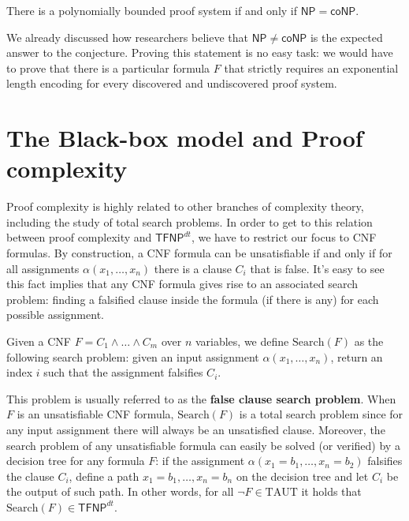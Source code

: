 \begin{proposition}
 There is a polynomially bounded proof system if and only if $\mathsf{NP} = \mathsf{coNP}$.
\end{proposition}

We already discussed how researchers believe that $\mathsf{NP} \neq \mathsf{coNP}$ is the expected answer to the conjecture. Proving this statement is no easy task: we would have to prove that there is a particular formula $F$ that strictly requires an exponential length encoding for every discovered and undiscovered proof system.

\newpage

\section{The Black-box model and Proof complexity}

Proof complexity is highly related to other branches of complexity theory, including the study of total search problems. In order to get to this relation between proof complexity and $\mathsf{TFNP}^{dt}$, we have to restrict our focus to CNF formulas. By construction, a CNF formula can be unsatisfiable if and only if for all assignments $\alpha(x_1, \ldots, x_n)$ there is a clause $C_i$ that is false. It's easy to see this fact implies that any CNF formula gives rise to an associated search problem: finding a falsified clause inside the formula (if there is any) for each possible assignment.

\begin{definition}
 Given a CNF $F = C_1 \land \ldots \land C_m$ over $n$ variables, we define $\mathrm{Search}(F)$ as the following search problem: given an input assignment $\alpha(x_1, \ldots, x_n)$, return an index $i$ such that the assignment falsifies $C_i$.
\end{definition}

This problem is usually referred to as the \textbf{false clause search problem}. When $F$ is an unsatisfiable CNF formula, $\mathrm{Search}(F)$ is a total search problem since for any input assignment there will always be an unsatisfied clause. Moreover, the search problem of any unsatisfiable formula can easily be solved (or verified) by a decision tree for any formula $F$: if the assignment $\alpha(x_1 = b_1, \ldots, x_n = b_2)$ falsifies the clause $C_i$, define a path $x_1 = b_1, \ldots, x_n = b_n$ on the decision tree and let $C_i$ be the output of such path. In other words, for all $\lnot F \in \mathrm{TAUT}$ it holds that $\mathrm{Search}(F) \in \mathsf{TFNP}^{dt}$. 


